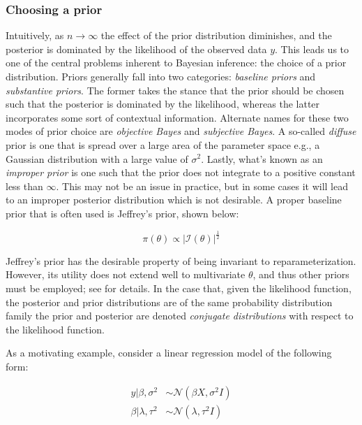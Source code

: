 \documentclass{report}
\begin{document}
\subsubsection{Choosing a prior}

Intuitively, as $n \to \infty$ the effect of the prior distribution diminishes, and the posterior is dominated by the likelihood of the observed data $y$. This leads us to one of the central problems inherent to Bayesian inference: the choice of a prior distribution. Priors generally fall into two categories: \textit{baseline priors} and \textit{substantive priors}. The former takes the stance that the prior should be chosen such that the posterior is dominated by the likelihood, whereas the latter incorporates some sort of contextual information. Alternate names for these two modes of prior choice are \textit{objective Bayes} and \textit{subjective Bayes}. A so-called \textit{diffuse} prior is one that is spread over a large area of the parameter space e.g., a Gaussian distribution with a large value of $\sigma^2$. Lastly, what's known as an \textit{improper prior} is one such that the prior does not integrate to a positive constant less than $\infty$. This may not be an issue in practice, but in some cases it will lead to an improper posterior distribution which is not desirable. A proper baseline prior that is often used is Jeffrey's prior, shown below:

\begin{equation}\label{eq:ols-bayes-jeffreys-prior}
    \pi(\theta) \propto |\mathcal{I}(\theta)|^{\frac{1}{2}}
\end{equation}

Jeffrey's prior has the desirable property of being invariant to reparameterization. However, its utility does not extend well to multivariate $\theta$, and thus other priors must be employed; see \cite[Chapter~3.4.1]{wakefield_bayesian_2013} for details. In the case that, given the likelihood function, the posterior and prior distributions are of the same probability distribution family the prior and posterior are denoted \textit{conjugate distributions} with respect to the likelihood function. 

As a motivating example, consider a linear regression model of the following form:

\begin{equation}\label{eq:ols-bayes-model-format}
    \begin{aligned}
        y | \beta, \sigma^2 &\sim \mathcal{N}(\beta X, \sigma^2I) \\
        \beta | \lambda, \tau^2 &\sim \mathcal{N}(\lambda, \tau^2I) \\
    \end{aligned}
\end{equation}
\end{document}

